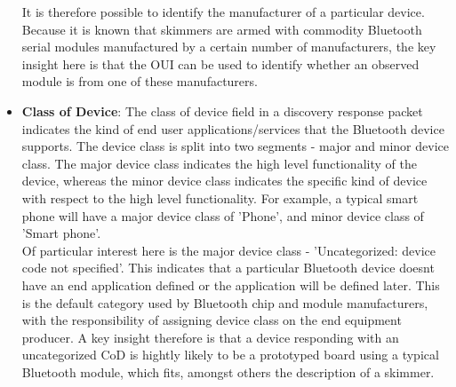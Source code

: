 \begin{itemize}
	It is therefore possible to identify the manufacturer of a particular
device. Because it is known that skimmers are armed with commodity Bluetooth
serial modules manufactured by a certain number of manufacturers, the key
insight here is that the OUI can be used to identify whether an observed module
is from one of these manufacturers.

	\item \textbf{Class of Device}: The class of device field in a discovery
response packet indicates the kind of end user applications/services that the
Bluetooth device supports. The device class is split into two segments - major
and minor device class. The major device class indicates the high level
functionality of the device, whereas the minor device class indicates the
specific kind of device with respect to the high level functionality. For
example, a typical smart phone will have a major device class of 'Phone', and
minor device class of 'Smart phone'.  \\ Of particular interest here is the
major device class - 'Uncategorized: device code not specified'. This indicates
that a particular Bluetooth device doesnt have an end application defined or the
application will be defined later. This is the default category used by
Bluetooth chip and module manufacturers, with the responsibility of assigning
device class on the end equipment producer. A key insight therefore is that a
device responding with an uncategorized CoD is hightly likely to be a prototyped
board using a typical Bluetooth module, which fits, amongst others the
description of a skimmer.


\end{itemize}
